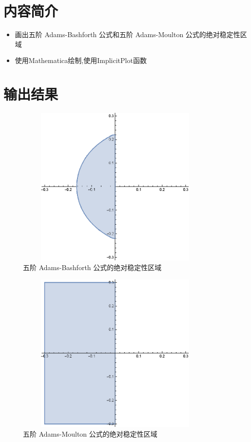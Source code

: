 \documentclass{ctexart}
\begin{document}
\section*{内容简介}
	\begin{itemize}
		\item 画出五阶 Adams-Bashforth 公式和五阶 Adams-Moulton 公式的绝对稳定性区域
		\item 使用Mathematica绘制,使用ImplicitPlot函数
	\end{itemize}

	
\section*{输出结果}
	\begin{figure}[H]
		\centering
		\includegraphics[width = 10cm, height = 8cm]{Adams-Bashforth-5.eps}
		\caption{五阶 Adams-Bashforth 公式的绝对稳定性区域} \label{figure-1.label}
	\end{figure}
	
	\begin{figure}[H]
		\centering
		\includegraphics[width = 10cm, height = 8cm]{Adams-Moulton-5.eps}
		\caption{五阶 Adams-Moulton 公式的绝对稳定性区域} \label{figure-2.label}
	\end{figure}
\end{document}
